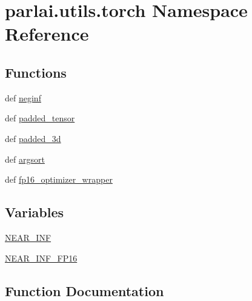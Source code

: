 \hypertarget{namespaceparlai_1_1utils_1_1torch}{}\section{parlai.\+utils.\+torch Namespace Reference}
\label{namespaceparlai_1_1utils_1_1torch}
\subsection*{Functions}
\begin{DoxyCompactItemize}
\item 
def \hyperlink{namespaceparlai_1_1utils_1_1torch_a6c6e25115353dba479cd72dc31dc76ae}{neginf}
\item 
def \hyperlink{namespaceparlai_1_1utils_1_1torch_a30f55f2d76c1e7f01e2612ecef231946}{padded\+\_\+tensor}
\item 
def \hyperlink{namespaceparlai_1_1utils_1_1torch_a1494906187c1ba19f92defb0d4c19ffe}{padded\+\_\+3d}
\item 
def \hyperlink{namespaceparlai_1_1utils_1_1torch_a6c7101b91c9bc5f6e00c4c65fc5ab21c}{argsort}
\item 
def \hyperlink{namespaceparlai_1_1utils_1_1torch_acd34433af9f43b196920120e6009494e}{fp16\+\_\+optimizer\+\_\+wrapper}
\end{DoxyCompactItemize}
\subsection*{Variables}
\begin{DoxyCompactItemize}
\item 
\hyperlink{namespaceparlai_1_1utils_1_1torch_ab38e7db22c2af18f6be15a319b63c489}{N\+E\+A\+R\+\_\+\+I\+NF}
\item 
\hyperlink{namespaceparlai_1_1utils_1_1torch_af25a0bd083e5ec4a1532b48acb165911}{N\+E\+A\+R\+\_\+\+I\+N\+F\+\_\+\+F\+P16}
\end{DoxyCompactItemize}


\subsection{Function Documentation}
\mbox{\label{namespaceparlai_1_1utils_1_1torch_a6c7101b91c9bc5f6e00c4c65fc5ab21c}} 
